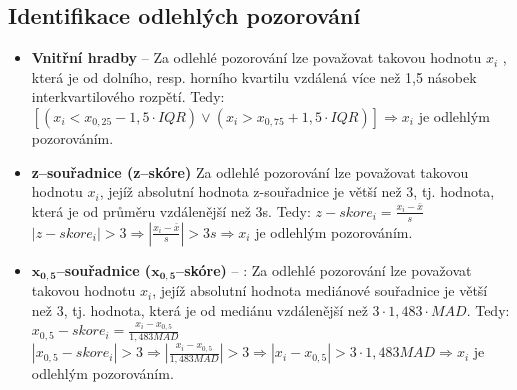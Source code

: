 \subsection{Identifikace odlehlých pozorování}
\begin{itemize}
	\item \textbf{Vnitřní hradby} -- Za odlehlé pozorování lze považovat takovou hodnotu $x_i$ , která je od dolního, resp. horního kvartilu vzdálená více než 1,5 násobek interkvartilového rozpětí. Tedy: $[(x_i < x_{0,25} - 1,5 \cdot IQR) \vee (x_i > x_{0,75} + 1,5 \cdot IQR)] \Rightarrow x_i$ je odlehlým pozorováním. 
	\item \textbf{z--souřadnice (z--skóre)} Za odlehlé pozorování lze považovat takovou hodnotu $x_i$, jejíž absolutní hodnota z-souřadnice je větší než 3, tj. hodnota, která je od průměru vzdálenější než 3s. Tedy: $z-skore_i = \frac{x_i - \bar{x}}{s}$ \\	
		$|z-skore_i| > 3 \Rightarrow |\frac{x_i - \bar{x}}{s}| >3s \Rightarrow x_i$ je odlehlým pozorováním.

	\item $\mathbf{x_{0,5}}$\textbf{--souřadnice ($\mathbf{x_{0,5}}$--skóre)} -- : Za odlehlé pozorování lze považovat takovou hodnotu $x_i$, jejíž absolutní hodnota mediánové souřadnice je větší než 3, tj. hodnota, která je od mediánu vzdálenější než $3 \cdot 1,483\cdot MAD$. Tedy: $x_{0,5}-skore_i = \frac{x_i - x_{0,5}}{1,483MAD}$ \\	
		$|x_{0,5}-skore_i| > 3 \Rightarrow |\frac{x_i - x_{0,5}}{1,483MAD}| >3 \Rightarrow |x_i - x_{0,5}| >3 \cdot 1,483MAD \Rightarrow x_i$ je odlehlým pozorováním.
\end{itemize}


